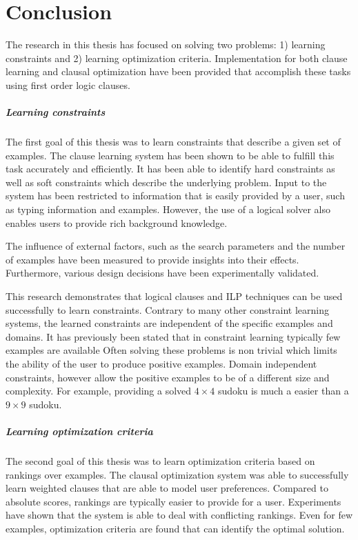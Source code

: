 \chapter{Conclusion}
\label{cha:conclusion}

The research in this thesis has focused on solving two problems: 1) learning constraints and 2) learning optimization criteria.
Implementation for both clause learning and clausal optimization have been provided that accomplish these tasks using first order logic clauses.

\paragraph{Learning constraints}
The first goal of this thesis was to learn constraints that describe a given set of examples.
The clause learning system has been shown to be able to fulfill this task accurately and efficiently.
It has been able to identify hard constraints as well as soft constraints which describe the underlying problem.
Input to the system has been restricted to information that is easily provided by a user, such as typing information and examples.
However, the use of a logical solver also enables users to provide rich background knowledge.

The influence of external factors, such as the search parameters and the number of examples have been measured to provide insights into their effects.
Furthermore, various design decisions have been experimentally validated.

This research demonstrates that logical clauses and ILP techniques can be used successfully to learn constraints.
Contrary to many other constraint learning systems, the learned constraints are independent of the specific examples and domains.
It has previously been stated that in constraint learning typically few examples are available
Often solving these problems is non trivial which limits the ability of the user to produce positive examples.
Domain independent constraints, however allow the positive examples to be of a different size and complexity.
For example, providing a solved $4 \times 4$ sudoku is much a easier than a $9 \times 9$ sudoku.

\paragraph{Learning optimization criteria}
The second goal of this thesis was to learn optimization criteria based on rankings over examples.
The clausal optimization system was able to successfully learn weighted clauses that are able to model user preferences.
Compared to absolute scores, rankings are typically easier to provide for a user.
Experiments have shown that the system is able to deal with conflicting rankings.
Even for few examples, optimization criteria are found that can identify the optimal solution.

